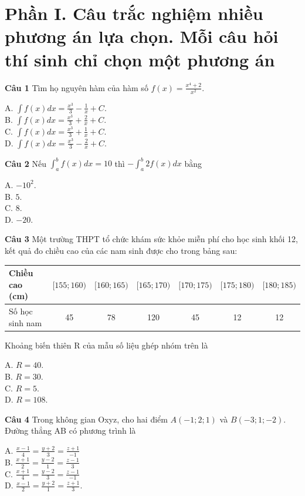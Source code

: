 \documentclass[12pt,a4paper]{article}
\begin{document}
\section*{Phần I. Câu trắc nghiệm nhiều phương án lựa chọn. Mỗi câu hỏi thí sinh chỉ chọn một phương án}

\textbf{Câu 1} Tìm họ nguyên hàm của hàm số $f(x)=\frac{x^{4}+2}{x^{2}}.$

A. $\int f(x)dx=\frac{x^{3}}{3}-\frac{1}{x}+C.$ \\
B. $\int f(x)dx=\frac{x^{3}}{3}+\frac{2}{x}+C.$ \\
C. $\int f(x)dx=\frac{x^{3}}{3}+\frac{1}{x}+C.$ \\
D. $\int f(x)dx=\frac{x^{3}}{3}-\frac{2}{x}+C.$

\textbf{Câu 2} Nếu $\int_{a}^{b}f(x)dx=10$ thì $-\int_{a}^{b}2f(x)dx$ bằng

A. $-10^{2}$.\\
B. $5$.\\
C. $8$.\\
D. $-20$.

\textbf{Câu 3} Một trường THPT tổ chức khám sức khỏe miễn phí cho học sinh khối 12, kết quả đo chiều cao của các nam sinh được cho trong bảng sau:

\begin{center}
\begin{tabular}{|l|c|c|c|c|c|c|}
\hline
Chiều cao (cm) & $[155;160)$ & $[160;165)$ & $[165;170)$ & $[170;175)$ & $[175;180)$ & $[180;185)$ \\
\hline
Số học sinh nam & 45 & 78 & 120 & 45 & 12 & 12 \\
\hline
\end{tabular}
\end{center}

Khoảng biến thiên R của mẫu số liệu ghép nhóm trên là

A. $R=40.$ \\
B. $R=30$. \\
C. $R=5$. \\
D. $R=108.$

\textbf{Câu 4} Trong không gian Oxyz, cho hai điểm $A(-1;2;1)$ và $B(-3;1;-2)$. Đường thẳng AB có phương trình là

A. $\frac{x-1}{4}=\frac{y+2}{3}=\frac{z+1}{-1}$ \\
B. $\frac{x+1}{2}=\frac{y-2}{1}=\frac{z-1}{3}$ \\
C. $\frac{x+1}{4}=\frac{y-2}{3}=\frac{z-1}{-1}$ \\
D. $\frac{x-1}{2}=\frac{y+2}{1}=\frac{z+1}{3}.$
\end{document}
